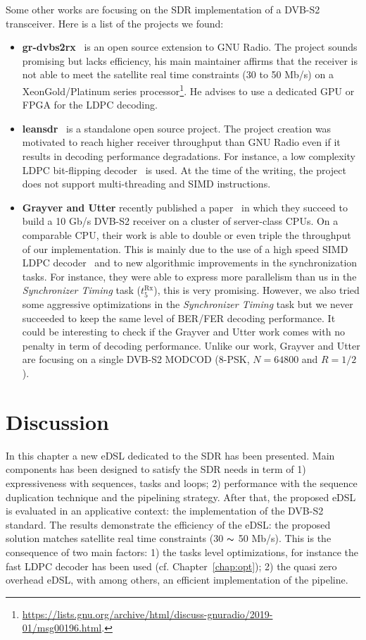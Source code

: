 Some other works are focusing on the SDR implementation of a DVB-S2 transceiver.
Here is a list of the projects we found:
\begin{itemize}
  \item \textbf{gr-dvbs2rx}~\cite{gr-dvbs2rx} is an open source extension to GNU
    Radio. The project sounds promising but lacks efficiency, his main
    maintainer affirms that the receiver is not able to meet the satellite real
    time constraints (30 to 50 Mb/s) on a Xeon\TM Gold/Platinum series
    processor\footnote{\url{https://lists.gnu.org/archive/html/discuss-gnuradio/2019-01/msg00196.html}.}.
    He advises to use a dedicated GPU or FPGA for the LDPC decoding.
  \item \textbf{leansdr}~\cite{leansdr} is a standalone open source project. The
    project creation was motivated to reach higher receiver throughput than GNU
    Radio even if it results in decoding performance degradations. For instance,
    a low complexity LDPC bit-flipping decoder~\cite{Ryan2009} is used. At the
    time of the writing, the project does not support multi-threading and SIMD
    instructions.
  \item \textbf{Grayver and Utter} recently published a paper~\cite{Grayver2020}
    in which they succeed to build a 10 Gb/s DVB-S2 receiver on a cluster of
    server-class CPUs. On a comparable CPU, their work is able to double or even
    triple the throughput of our implementation. This is mainly due to the use
    of a high speed SIMD LDPC decoder~\cite{LeGal2016,Grayver2019} and to new
    algorithmic improvements in the synchronization tasks. For instance, they
    were able to express more parallelism than us in the \emph{Synchronizer
    Timing} task ($t^\text{Rx}_{5}$), this is very promising. However, we also
    tried some aggressive optimizations in the \emph{Synchronizer Timing} task
    but we never succeeded to keep the same level of BER/FER decoding
    performance. It could be interesting to check if the Grayver and Utter work
    comes with no penalty in term of decoding performance. Unlike our work,
    Grayver and Utter are focusing on a single DVB-S2 MODCOD (8-PSK, $N = 64800$
    and $R = 1/2$).
\end{itemize}

\section{Discussion}

In this chapter a new eDSL dedicated to the SDR has been presented. Main
components has been designed to satisfy the SDR needs in term of 1)
expressiveness with sequences, tasks and loops; 2) performance with the sequence
duplication technique and the pipelining strategy. After that, the proposed eDSL
is evaluated in an applicative context: the implementation of the DVB-S2
standard. The results demonstrate the efficiency of the \AFFECT eDSL: the
proposed solution matches satellite real time constraints (30 $\thicksim$ 50
Mb/s). This is the consequence of two main factors: 1) the tasks level
optimizations, for instance the fast LDPC decoder has been used (cf.
Chapter~\ref{chap:opt}); 2) the quasi zero overhead eDSL, with among others, an
efficient implementation of the pipeline.

